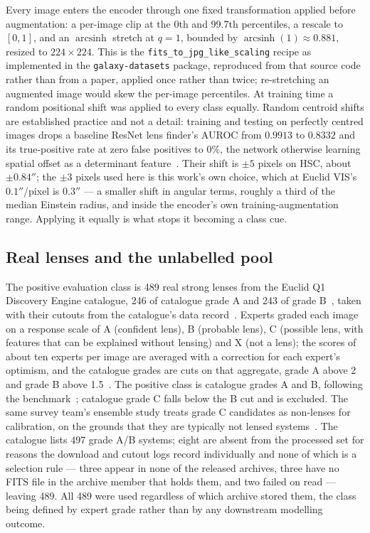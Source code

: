 Every image enters the encoder through one fixed transformation applied before
augmentation: a per-image clip at the 0th and 99.7th percentiles, a rescale to $[0,1]$,
and an $\operatorname{arcsinh}$ stretch at $q = 1$, bounded by
$\operatorname{arcsinh}(1) \approx 0.881$, resized to $224 \times 224$. This is the
\texttt{fits\_to\_jpg\_like\_scaling} recipe as implemented in the \texttt{galaxy-datasets}
package, reproduced from that source code rather than from a paper, applied once rather than twice;
re-stretching an augmented image would skew the per-image percentiles. At training time a
random positional shift was applied to every class equally. Random centroid shifts are
established practice and not a detail: training and testing on perfectly centred images
drops a baseline ResNet lens finder's AUROC from $0.9913$ to $0.8332$ and its
true-positive rate at zero false positives to $0\%$, the network otherwise learning spatial
offset as a determinant feature~\citep{holismokesXI}. Their shift is $\pm 5$ pixels on
HSC, about $\pm 0.84''$; the $\pm 3$ pixels used here is this work's own choice, which at
Euclid VIS's $0.1''$/pixel is $0.3''$ --- a smaller shift in angular terms, roughly a
third of the median Einstein radius, and inside the encoder's own training-augmentation
range. Applying it equally is what stops it becoming a class cue.

\subsection{Real lenses and the unlabelled pool}

The positive evaluation class is 489 real strong lenses from the Euclid Q1 Discovery
Engine catalogue, 246 of catalogue grade A and 243 of grade B~\citep{discoveryengineA},
taken with their cutouts from the catalogue's data record~\citep{discoveryenginecat}.
Experts graded each image on a response scale of A (confident lens), B (probable lens), C
(possible lens, with features that can be explained without lensing) and X (not a lens);
the scores of about ten experts per image are averaged with a correction for each expert's
optimism, and the catalogue grades are cuts on that aggregate, grade A above 2 and grade B
above 1.5~\citep{discoveryengineA}. The positive class is catalogue grades A and B,
following the benchmark~\citep{lines2025simstosky}; catalogue grade C falls below the B cut
and is excluded. The same survey team's ensemble study treats grade C candidates as
non-lenses for calibration, on the grounds that they are typically not lensed
systems~\citep{discoveryengineE}. The catalogue lists 497 grade A/B systems; eight are absent from the processed set for reasons the download and cutout logs record individually and none of which is a selection rule --- three appear in none of the released archives, three have no FITS file in the archive member that holds them, and two failed on read --- leaving 489. All 489 were used regardless of which archive stored them, the class being
defined by expert grade rather than by any downstream modelling outcome.

